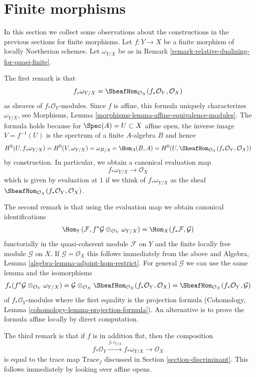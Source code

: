 \section{Finite morphisms}
\label{section-finite-morphisms}

\noindent
In this section we collect some observations about the
constructions in the previous sections for finite morphisms.
Let $f : Y \to X$ be a finite morphism of locally Noetherian schemes.
Let $\omega_{Y/X}$ be as in
Remark \ref{remark-relative-dualizing-for-quasi-finite}.

\medskip\noindent
The first remark is that
$$
f_*\omega_{Y/X} = \SheafHom_{\mathcal{O}_X}(f_*\mathcal{O}_Y, \mathcal{O}_X)
$$
as sheaves of $f_*\mathcal{O}_Y$-modules. Since $f$ is affine, this
formula uniquely characterizes $\omega_{Y/X}$, see
Morphisms, Lemma \ref{morphisms-lemma-affine-equivalence-modules}.
The formula holds because for $\Spec(A) = U \subset X$ affine open, the
inverse image $V = f^{-1}(U)$ is the spectrum of a finite $A$-algebra
$B$ and hence
$$
H^0(U, f_*\omega_{Y/X}) =
H^0(V, \omega_{Y/X}) =
\omega_{B/A} =
\Hom_A(B, A) =
H^0(U, \SheafHom_{\mathcal{O}_X}(f_*\mathcal{O}_Y, \mathcal{O}_X))
$$
by construction. In particular, we obtain a canonical evaluation map
$$
f_*\omega_{Y/X} \longrightarrow \mathcal{O}_X
$$
which is given by evaluation at $1$ if we think of $f_*\omega_{Y/X}$
as the sheaf $\SheafHom_{\mathcal{O}_X}(f_*\mathcal{O}_Y, \mathcal{O}_X)$.

\medskip\noindent
The second remark is that using the evaluation map we obtain
canonical identifications
$$
\Hom_Y(\mathcal{F}, f^*\mathcal{G} \otimes_{\mathcal{O}_Y} \omega_{Y/X})
=
\Hom_X(f_*\mathcal{F}, \mathcal{G})
$$
functorially in the quasi-coherent module $\mathcal{F}$ on $Y$
and the finite locally free module $\mathcal{G}$ on $X$.
If $\mathcal{G} = \mathcal{O}_X$ this follows immediately
from the above and
Algebra, Lemma \ref{algebra-lemma-adjoint-hom-restrict}.
For general $\mathcal{G}$ we can use the same lemma and the
isomorphisms
$$
f_*(f^*\mathcal{G} \otimes_{\mathcal{O}_Y} \omega_{Y/X}) =
\mathcal{G} \otimes_{\mathcal{O}_X}
\SheafHom_{\mathcal{O}_X}(f_*\mathcal{O}_Y, \mathcal{O}_X) =
\SheafHom_{\mathcal{O}_X}(f_*\mathcal{O}_Y, \mathcal{G})
$$
of $f_*\mathcal{O}_Y$-modules where the first equality is the
projection formula
(Cohomology, Lemma \ref{cohomology-lemma-projection-formula}).
An alternative is to prove the formula affine locally by
direct computation.

\medskip\noindent
The third remark is that if $f$ is in addition flat, then the
composition
$$
f_*\mathcal{O}_Y \xrightarrow{f_*\tau_{Y/X}} f_*\omega_{Y/X}
\longrightarrow \mathcal{O}_X
$$
is equal to the trace map $\text{Trace}_f$ discussed in
Section \ref{section-discriminant}. This follows immediately by
looking over affine opens.

